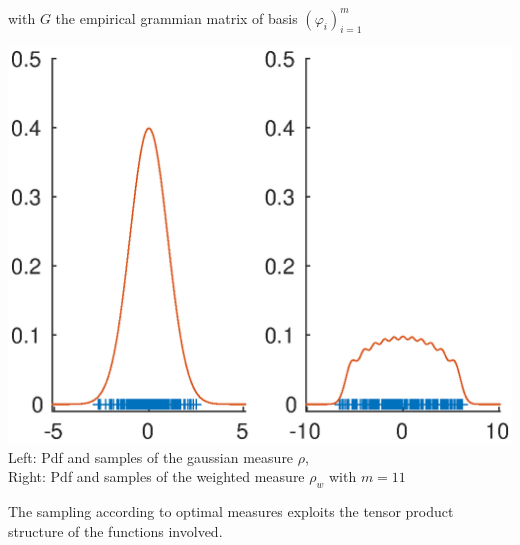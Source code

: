 \documentclass[portrait,a0paper]{baposter}
\begin{document}
\begin{poster}
{	\vspace{-0.3cm}
	with $G$ the empirical grammian matrix of basis $(\varphi_i)_{i=1}^m$
	\begin{center}
	\vspace{-0.3cm}
	\includegraphics[scale=0.40]{OWLS}\\
	\footnotesize{Left: Pdf and samples of the gaussian measure $\rho$,\\ Right: Pdf and samples of the weighted measure $\rho_w$ with $m=11$}
	\end{center}
	\vspace{-0.3cm}
	The sampling according to optimal measures exploits the tensor product structure of the functions involved.
}


\end{poster}
\end{document}
